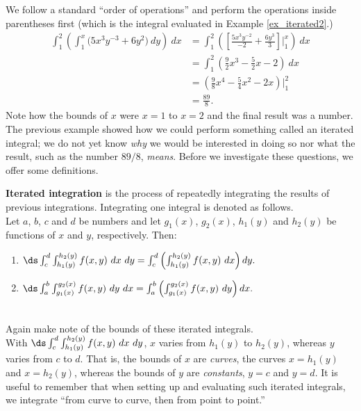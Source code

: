 {We follow a standard ``order of operations'' and perform the operations inside parentheses first (which is the integral evaluated in Example \ref{ex_iterated2}.)
\begin{align*}
\int_1^2\left(\int_1^x\big(5x^3y^{-3}+6y^2\big)\ dy\right)\ dx &= \int_1^2 \left(\left[\frac{5x^3y^{-2}}{-2}+\frac{6y^3}{3}\right]\Bigg|_1^x\right)\ dx \\
			&= \int_1^2 \left(\frac92x^3-\frac52x-2\right)\ dx \\
			&= \left(\frac98x^4-\frac54x^2-2x\right)\Bigg|_1^2\\
			&= \frac{89}8.
\end{align*}
Note how the bounds of $x$ were $x=1$ to $x=2$ and the final result was a number.
}\\

The previous example showed how we could perform something called an iterated integral; we do not yet know \textit{why} we would be interested in doing so nor what the result, such as the number $89/8$, \textit{means}. Before we investigate these questions, we offer some definitions.

{\textbf{Iterated integration} is the process of repeatedly integrating the results of previous integrations. Integrating one integral is denoted as follows.\\

Let $a$, $b$, $c$ and $d$ be numbers and let $g_1(x)$, $g_2(x)$, $h_1(y)$ and $h_2(y)$ be functions of $x$ and $y$, respectively. Then:
\begin{enumerate}
	\item $\ds \int_c^d\int_{h_1(y)}^{h_2(y)} f(x,y)\ dx\ dy = \int_c^d\left(\int_{h_1(y)}^{h_2(y)} f(x,y)\ dx\right) dy.$
	\item $\ds \int_a^b\int_{g_1(x)}^{g_2(x)} f(x,y)\ dy\ dx = \int_a^b\left(\int_{g_1(x)}^{g_2(x)} f(x,y)\ dy\right) dx.$
\end{enumerate}
}\\

Again make note of the bounds of these iterated integrals.\\
With $\ds \int_c^d\int_{h_1(y)}^{h_2(y)} f(x,y)\ dx\ dy$, $x$ varies from $h_1(y)$ to $h_2(y)$, whereas $y$ varies from $c$ to $d$. That is, the bounds of $x$ are \textit{curves}, the curves $x=h_1(y)$ and $x=h_2(y)$, whereas the bounds of $y$ are \textit{constants}, $y=c$ and $y=d$. It is useful to remember that when setting up and evaluating such iterated integrals, we integrate ``from curve to curve, then from point to point.''

